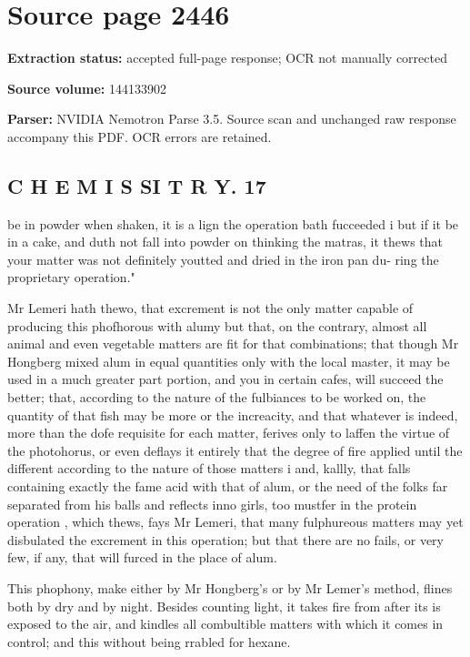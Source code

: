 \clearpage
\section{Source page 2446}
\textbf{Extraction status:} accepted full-page response; OCR not manually corrected\par
\textbf{Source volume:} 144133902\par
\textbf{Parser:} NVIDIA Nemotron Parse 3.5. Source scan and unchanged raw response accompany this PDF. OCR errors are retained.\par\medskip
\subsection*{C H E M I S SI T R Y. 17}
be in powder when shaken, it is a lign the operation bath fucceeded i but if it be in a cake, and duth not fall into powder on thinking the matras, it thews that your matter was not definitely youtted and dried in the iron pan du- ring the proprietary operation."\par\medskip
Mr Lemeri hath thewo, that excrement is not the only matter capable of producing this phofhorous with alumy but that, on the contrary, almost all animal and even vegetable matters are fit for that combinations; that though Mr Hongberg mixed alum in equal quantities only with the local master, it may be used in a much greater part portion, and you in certain cafes, will succeed the better; that, according to the nature of the fulbiances to be worked on, the quantity of that fish may be more or the increacity, and that whatever is indeed, more than the dofe requisite for each matter, ferives only to laffen the virtue of the photohorus, or even deflays it entirely that the degree of fire applied until the different according to the nature of those matters i and, kallly, that falls containing exactly the fame acid with that of alum, or the need of the folks far separated from his balls and reflects inno girls, too mustfer in the protein operation , which thews, fays Mr Lemeri, that many fulphureous matters may yet disbulated the excrement in this operation; but that there are no fails, or very few, if any, that will furced in the place of alum.\par\medskip
This phophony, make either by Mr Hongberg’s or by Mr Lemer’s method, flines both by dry and by night. Besides counting light, it takes fire from after its is exposed to the air, and kindles all combultible matters with which it comes in control; and this without being rrabled for hexane.\par\medskip
